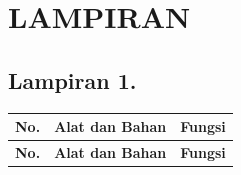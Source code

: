 \chapter*{LAMPIRAN}

\section*{Lampiran 1. }
\label{Lampiran 1}
\begin{longtable}{c >{\centering\arraybackslash}m{4cm} m{8cm}}
  \toprule
  \textbf{No.} & \textbf{Alat dan Bahan} & \textbf{Fungsi} \\
  \midrule
  \endfirsthead

  \toprule
  \textbf{No.} & \textbf{Alat dan Bahan} & \textbf{Fungsi} \\
  \midrule
  \endhead


\end{longtable}
